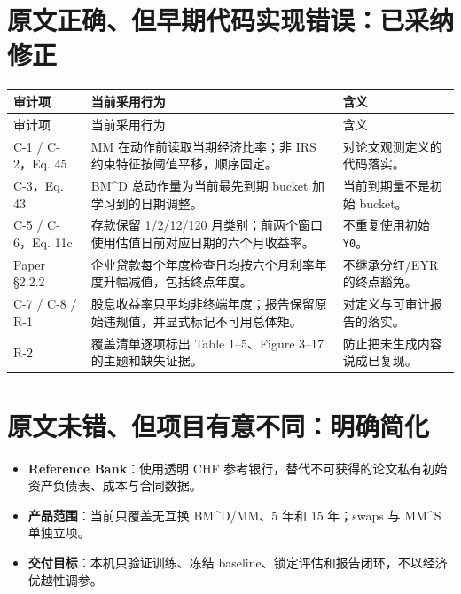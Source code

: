 \documentclass[UTF8,10pt,a4paper,fontset=fandol]{ctexart}
\begin{document}
\section{原文正确、但早期代码实现错误：已采纳修正}
\begin{longtable}{@{}P{26mm}P{66mm}P{64mm}@{}}
\toprule
审计项 & 当前采用行为 & 含义 \\
\midrule
\endfirsthead
\toprule 审计项 & 当前采用行为 & 含义 \\ \midrule
\endhead
C-1 / C-2，Eq. 45 & MM 在动作前读取当期经济比率；非 IRS 约束特征按阈值平移，顺序固定。 & 对论文观测定义的代码落实。 \\
C-3，Eq. 43 & BM\textasciicircum D 总动作量为当前最先到期 bucket 加学习到的日期调整。 & 当前到期量不是初始 bucket。 \\
C-5 / C-6，Eq. 11c & 存款保留 1/2/12/120 月类别；前两个窗口使用估值日前对应日期的六个月收益率。 & 不重复使用初始 \texttt{Y0}。 \\
Paper \S2.2.2 & 企业贷款每个年度检查日均按六个月利率年度升幅减值，包括终点年度。 & 不继承分红/EYR 的终点豁免。 \\
C-7 / C-8 / R-1 & 股息收益率只平均非终端年度；报告保留原始违规值，并显式标记不可用总体矩。 & 对定义与可审计报告的落实。 \\
R-2 & 覆盖清单逐项标出 Table 1--5、Figure 3--17 的主题和缺失证据。 & 防止把未生成内容说成已复现。 \\
\bottomrule
\end{longtable}

\section{原文未错、但项目有意不同：明确简化}
\begin{itemize}[leftmargin=2em]
  \item \textbf{Reference Bank}：使用透明 CHF 参考银行，替代不可获得的论文私有初始资产负债表、成本与合同数据。
  \item \textbf{产品范围}：当前只覆盖无互换 BM\textasciicircum D/MM、5 年和 15 年；swaps 与 MM\textasciicircum S 单独立项。
  \item \textbf{交付目标}：本机只验证训练、冻结 baseline、锁定评估和报告闭环，不以经济优越性调参。
\end{itemize}
\end{document}

